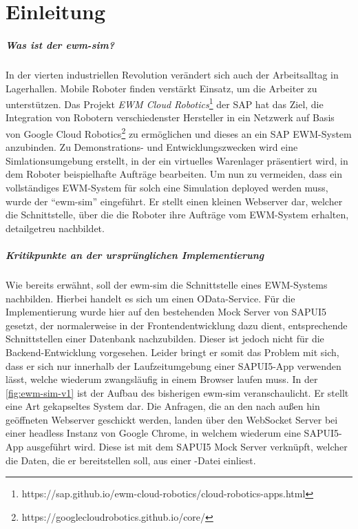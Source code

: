 \chapter{Einleitung}

\paragraph{Was ist der \ac{ewm-sim}?}
In der vierten industriellen Revolution verändert sich auch der Arbeitsalltag in Lagerhallen.
Mobile Roboter finden verstärkt Einsatz, um die Arbeiter zu unterstützen.
Das Projekt \emph{\ac{EWM} Cloud Robotics}\footnote{https://sap.github.io/ewm-cloud-robotics/cloud-robotics-apps.html} der SAP hat das Ziel, die Integration von Robotern verschiedenster Hersteller in ein Netzwerk auf Basis von Google Cloud Robotics\footnote{https://googlecloudrobotics.github.io/core/} zu ermöglichen und dieses an ein SAP \ac{EWM}-System anzubinden.
Zu Demonstrations- und Entwicklungszwecken wird eine Simlationsumgebung erstellt, in der ein virtuelles Warenlager präsentiert wird, in dem Roboter beispielhafte Aufträge bearbeiten.
Um nun zu vermeiden, dass ein vollständiges \ac{EWM}-System für solch eine Simulation deployed werden muss, wurde der \enquote{\ac{ewm-sim}} eingeführt.
Er stellt einen kleinen Webserver dar, welcher die Schnittstelle, über die die Roboter ihre Aufträge vom \ac{EWM}-System erhalten, detailgetreu nachbildet.

\paragraph{Kritikpunkte an der ursprünglichen Implementierung}
Wie bereits erwähnt, soll der \ac{ewm-sim} die Schnittstelle eines \ac{EWM}-Systems nachbilden. Hierbei handelt es sich um einen \ac{OData}-Service.
Für die Implementierung wurde hier auf den bestehenden Mock Server von SAPUI5 gesetzt, der normalerweise in der Frontendentwicklung dazu dient, entsprechende Schnittstellen einer Datenbank nachzubilden.
Dieser ist jedoch nicht für die Backend-Entwicklung vorgesehen.
Leider bringt er somit das Problem mit sich, dass er sich nur innerhalb der Laufzeitumgebung einer SAPUI5-App verwenden lässt, welche wiederum zwangsläufig in einem Browser laufen muss.
In der \autoref{fig:ewm-sim-v1} ist der Aufbau des bisherigen \ac{ewm-sim} veranschaulicht.
Er stellt eine Art gekapseltes System dar.
Die Anfragen, die an den nach außen hin geöffneten Webserver geschickt werden, landen über den WebSocket Server bei einer headless Instanz von Google Chrome, in welchem wiederum eine SAPUI5-App ausgeführt wird.
Diese ist mit dem SAPUI5 Mock Server verknüpft, welcher die Daten, die er bereitstellen soll, aus einer -Datei einliest.

